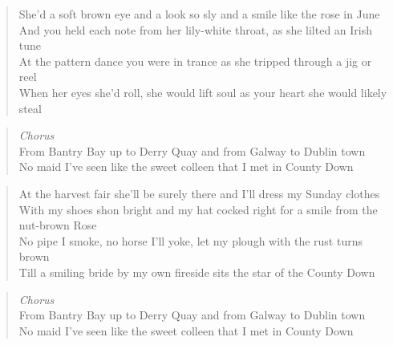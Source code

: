 \documentclass[9pt,a4paper,oneside, onecolumn]{article}
\begin{document}
\begin{verse}
She'd a soft brown eye and a look so sly and a smile like the rose in June\\
And you held each note from her lily-white throat, as she lilted an Irish tune\\
At the pattern dance you were in trance as she tripped through a jig or reel\\
When her eyes she'd roll, she would lift soul as your heart she would likely steal\\
\end{verse}

\begin{verse}
\textit{Chorus}\\
From Bantry Bay up to Derry Quay and from Galway to Dublin town\\
No maid I've seen like the sweet colleen that I met in County Down\\
\end{verse}

\begin{verse}
At the harvest fair she'll be surely there and I'll dress my Sunday clothes\\
With my shoes shon bright and my hat cocked right for a smile from the nut-brown Rose\\
No pipe I smoke, no horse I'll yoke, let my plough with the rust turns brown\\
Till a smiling bride  by my own fireside sits the star of the County Down\\
\end{verse}

\begin{verse}
\textit{Chorus}\\
From Bantry Bay up to Derry Quay and from Galway to Dublin town\\
No maid I've seen like the sweet colleen that I met in County Down\\
\end{verse}
\end{document}
